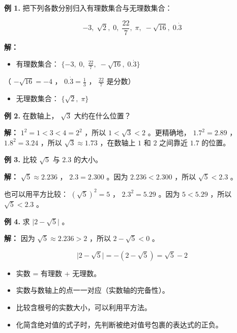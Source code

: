 \begin{workedexamples}


\textbf{例 1.} 把下列各数分别归入有理数集合与无理数集合：

\[
-3,\; \sqrt{2},\; 0,\; \frac{22}{7},\; \pi,\; -\sqrt{16},\; 0.\dot{3}
\]


\textbf{解：}

\begin{itemize}
  \item 有理数集合： $\{-3,\; 0,\; \frac{22}{7},\; -\sqrt{16},\; 0.\dot{3}\}$
\end{itemize}


  （ $-\sqrt{16} = -4$ ， $0.\dot{3} = \frac{1}{3}$ ， $\frac{22}{7}$ 是分数）

\begin{itemize}
  \item 无理数集合： $\{\sqrt{2},\; \pi\}$
\end{itemize}


\textbf{例 2.} 在数轴上， $\sqrt{3}$ 大约在什么位置？

\textbf{解：} $1^2 = 1 < 3 < 4 = 2^2$ ，所以 $1 < \sqrt{3} < 2$ 。更精确地， $1.7^2 = 2.89$ ， $1.8^2 = 3.24$ ，所以 $\sqrt{3} \approx 1.73$ ，在数轴上 $1$ 和 $2$ 之间靠近 $1.7$ 的位置。

\textbf{例 3.} 比较 $\sqrt{5}$ 与 $2.3$ 的大小。

\textbf{解：} $\sqrt{5} \approx 2.236$ ， $2.3 = 2.300$ 。因为 $2.236 < 2.300$ ，所以 $\sqrt{5} < 2.3$ 。

也可以用平方比较： $(\sqrt{5})^2 = 5$ ， $2.3^2 = 5.29$ 。因为 $5 < 5.29$ ，所以 $\sqrt{5} < 2.3$ 。

\textbf{例 4.} 求 $\lvert 2 - \sqrt{5} \rvert$ 。

\textbf{解：} 因为 $\sqrt{5} \approx 2.236 > 2$ ，所以 $2 - \sqrt{5} < 0$ 。

\[
\lvert 2 - \sqrt{5} \rvert = -(2 - \sqrt{5}) = \sqrt{5} - 2
\]


\end{workedexamples}

\begin{keytakeaway}


\begin{itemize}
  \item 实数 = 有理数 + 无理数。
  \item 实数与数轴上的点一一对应（实数轴的完备性）。
  \item 比较含根号的实数大小，可以利用平方法。
  \item 化简含绝对值的式子时，先判断被绝对值号包裹的表达式的正负。
\end{itemize}


\end{keytakeaway}

